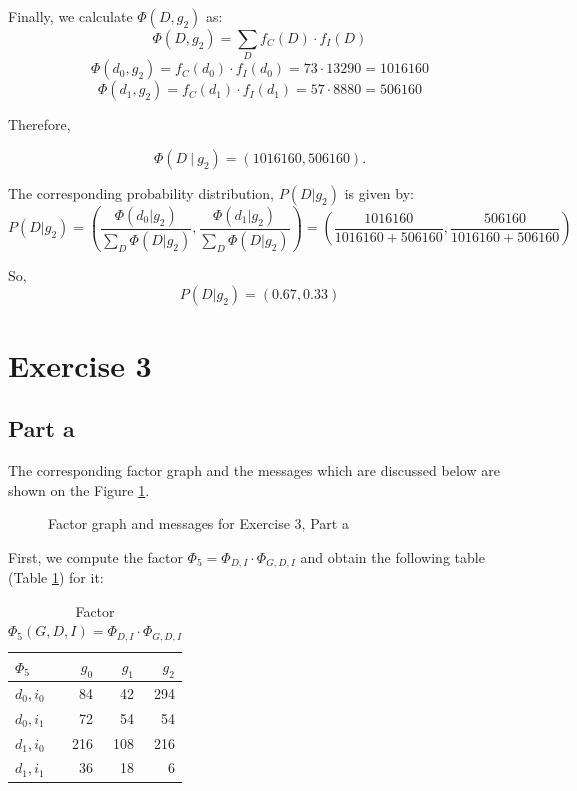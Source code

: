 \documentclass[11pt,a4paper]{article}
\begin{document}
	Finally, we calculate $ \Phi(D, g_2) $ as:
	$$\Phi(D,  g_2) = \sum_{D}f_C(D) \cdot f_I(D)$$
	$$\Phi(d_0, g_2) = f_C(d_0) \cdot f_I(d_0) = 73 \cdot 13290 = 1016160 $$
	$$\Phi(d_1, g_2) = f_C(d_1) \cdot f_I(d_1) = 57 \cdot 8880 = 506160 $$
	
	Therefore,
	
	$$ \Phi(D \ | \ g_2) = (1016160, 506160). $$
	
	The corresponding probability distribution, $P(D | g_2)$ is given by:
	$$ P(D | g_2) = \left(\frac{\Phi(d_0 | g_2)}{\sum_{D}\Phi(D | g_2)}, \frac{\Phi(d_1 | g_2)}{\sum_{D}\Phi(D | g_2)}\right) = \left(\frac{1016160}{1016160+506160},\frac{506160}{1016160+506160}\right) $$
	
	So,
	$$ P(D | g_2) = (0.67,0.33) $$
	
\section*{Exercise 3}

\subsection*{Part a}

The corresponding factor graph and the messages which are discussed below are shown on the Figure \ref{fig:fgraph_3a}.

\begin{figure}[H]
	\caption{Factor graph and messages for Exercise 3, Part a}
	\label{fig:fgraph_3a}
\end{figure}

First, we compute the factor $\Phi_5 = \Phi_{D, I} \cdot \Phi_{G, D, I}$ and obtain the following table (Table \ref{tab:f5}) for it:

\begin{table}[H]
	\centering
	\begin{tabular}{l|rrr}
		\toprule
		$\Phi_5$ & $g_0$ & $g_1$ & $g_2$ \\
		\midrule 
		$d_0, i_0$ & 84 & 42 & 294 \\
		$d_0, i_1$ & 72 & 54 & 54 \\
		$d_1, i_0$ & 216 & 108 & 216 \\
		$d_1, i_1$ & 36 & 18 & 6 \\
		\bottomrule
	\end{tabular}
	\caption{Factor $\Phi_5(G, D, I) =  \Phi_{D, I} \cdot \Phi_{G, D, I}$}
	\label{tab:f5}
\end{table}
	
\end{document}
